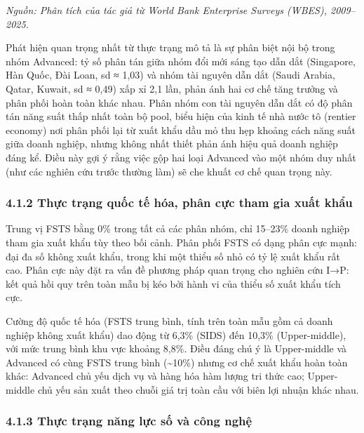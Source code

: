 \documentclass[12pt,a4paper]{article}
\begin{document}
\emph{Nguồn: Phân tích của tác giả từ World Bank Enterprise Surveys
(WBES), 2009--2025.}

Phát hiện quan trọng nhất từ thực trạng mô tả là sự phân biệt nội bộ
trong nhóm Advanced: tỷ số phân tán giữa nhóm đổi mới sáng tạo dẫn dắt
(Singapore, Hàn Quốc, Đài Loan, sd ≈ 1,03) và nhóm tài nguyên dẫn dắt
(Saudi Arabia, Qatar, Kuwait, sd ≈ 0,49) xấp xỉ 2,1 lần, phản ánh hai cơ
chế tăng trưởng và phân phối hoàn toàn khác nhau. Phân nhóm con tài
nguyên dẫn dắt có độ phân tán năng suất thấp nhất toàn bộ pool, biểu
hiện của kinh tế nhà nước tô (rentier economy) nơi phân phối lại từ xuất
khẩu dầu mỏ thu hẹp khoảng cách năng suất giữa doanh nghiệp, nhưng không
nhất thiết phản ánh hiệu quả doanh nghiệp đáng kể. Điều này gợi ý rằng
việc gộp hai loại Advanced vào một nhóm duy nhất (như các nghiên cứu
trước thường làm) sẽ che khuất cơ chế quan trọng này.

\hypertarget{412-thux1ef1c-trux1ea1ng-quux1ed1c-tux1ebf-huxf3a-phuxe2n-cux1ef1c-tham-gia-xuux1ea5t-khux1ea9u}{%
\subsubsection{4.1.2 Thực trạng quốc tế hóa, phân cực tham gia xuất
khẩu}\label{412-thux1ef1c-trux1ea1ng-quux1ed1c-tux1ebf-huxf3a-phuxe2n-cux1ef1c-tham-gia-xuux1ea5t-khux1ea9u}}

Trung vị FSTS bằng 0\% trong tất cả các phân nhóm, chỉ 15--23\% doanh
nghiệp tham gia xuất khẩu tùy theo bối cảnh. Phân phối FSTS có dạng phân
cực mạnh: đại đa số không xuất khẩu, trong khi một thiểu số nhỏ có tỷ lệ
xuất khẩu rất cao. Phân cực này đặt ra vấn đề phương pháp quan trọng cho
nghiên cứu I→P: kết quả hồi quy trên toàn mẫu bị kéo bởi hành vi của
thiểu số xuất khẩu tích cực.

Cường độ quốc tế hóa (FSTS trung bình, tính trên toàn mẫu gồm cả doanh
nghiệp không xuất khẩu) dao động từ 6,3\% (SIDS) đến 10,3\%
(Upper-middle), với mức trung bình khu vực khoảng 8,8\%. Điều đáng chú ý
là Upper-middle và Advanced có cùng FSTS trung bình
(\textasciitilde10\%) nhưng cơ chế xuất khẩu hoàn toàn khác: Advanced
chủ yếu dịch vụ và hàng hóa hàm lượng tri thức cao; Upper-middle chủ yếu
sản xuất theo chuỗi giá trị toàn cầu với biên lợi nhuận khác nhau.

\hypertarget{413-thux1ef1c-trux1ea1ng-nux103ng-lux1ef1c-sux1ed1-vuxe0-cuxf4ng-nghux1ec7}{%
\subsubsection{4.1.3 Thực trạng năng lực số và công
nghệ}\label{413-thux1ef1c-trux1ea1ng-nux103ng-lux1ef1c-sux1ed1-vuxe0-cuxf4ng-nghux1ec7}}
\end{document}
